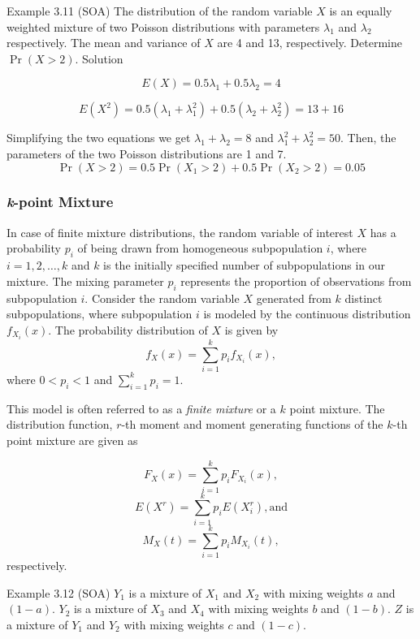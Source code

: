 \documentclass[]{book}
\theoremstyle{definition}
\theoremstyle{definition}
\theoremstyle{definition}
\theoremstyle{remark}
\begin{document}
Example 3.11 (SOA) The distribution of the random variable \(X\) is an
equally weighted mixture of two Poisson distributions with parameters
\(\lambda_{1}\) and \(\lambda_{2}\) respectively. The mean and variance
of \(X\) are 4 and 13, respectively. Determine
\(\Pr\left( X > 2 \right)\). Solution

\[E\left( X \right) = 0.5\lambda_{1} + 0.5\lambda_{2} = 4\]

\[E\left( X^{2} \right) = 0.5\left( \lambda_{1} + \lambda_{1}^{2} \right) + 0.5\left( \lambda_{2} + \lambda_{2}^{2} \right) = 13 + 16\]

Simplifying the two equations we get \(\lambda_{1} + \lambda_{2} = 8\)
and \(\lambda_{1}^{2} + \lambda_{2}^{2} = 50\). Then, the parameters of
the two Poisson distributions are 1 and 7.
\[\Pr\left( X > 2 \right) = 0.5\Pr\left( X_{1} > 2 \right) + 0.5\Pr\left( X_{2} > 2 \right) = 0.05\]

\subsubsection{\texorpdfstring{\emph{k}-point
Mixture}{k-point Mixture}}\label{k-point-mixture}

In case of finite mixture distributions, the random variable of interest
\(X\) has a probability \(p_{i}\) of being drawn from homogeneous
subpopulation \(i\), where \(i = 1,2,\ldots,k\) and \(k\) is the
initially specified number of subpopulations in our mixture. The mixing
parameter \(p_{i}\) represents the proportion of observations from
subpopulation \(i\). Consider the random variable \(X\) generated from
\(k\) distinct subpopulations, where subpopulation \(i\) is modeled by
the continuous distribution \(f_{X_{i}}\left( x \right)\). The
probability distribution of \(X\) is given by
\[f_{X}\left( x \right) = \sum_{i = 1}^{k}{p_{i}f_{X_{i}}\left( x \right)},\]
where \(0 < p_{i} < 1\) and \(\sum_{i = 1}^{k} p_{i} = 1\).

This model is often referred to as a \emph{finite mixture} or a \(k\)
point mixture. The distribution function, \(r\)-th moment and moment
generating functions of the \(k\)-th point mixture are given as

\[F_{X}\left( x \right) = \sum_{i = 1}^{k}{p_{i}F_{X_{i}}\left( x \right)},\]
\[E\left( X^{r} \right) = \sum_{i = 1}^{k}{p_{i}E\left( X_{i}^{r} \right)}, \text{and}\]
\[M_{X}\left( t \right) = \sum_{i = 1}^{k}{p_{i}M_{X_{i}}\left( t \right)},\]
respectively.

Example 3.12 (SOA) \(Y_{1}\) is a mixture of \(X_{1}\) and \(X_{2}\)
with mixing weights \(a\) and \((1 - a)\). \(Y_{2}\) is a mixture of
\(X_{3}\) and \(X_{4}\) with mixing weights \(b\) and \((1 - b)\). \(Z\)
is a mixture of \(Y_{1}\) and \(Y_{2}\) with mixing weights \(c\) and
\((1 - c)\).
\end{document}
